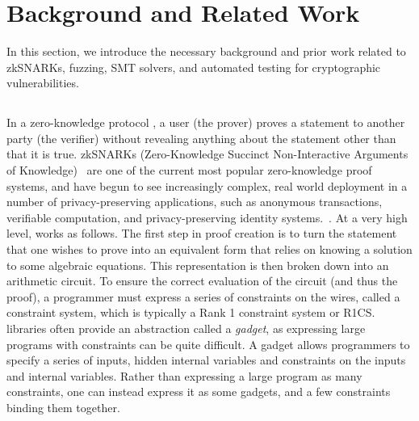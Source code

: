 \section{Background and Related Work}
\label{sec:snarkprobe-background}

In this section, we introduce the necessary background and prior work related to zkSNARKs, fuzzing, SMT solvers, and automated testing for cryptographic vulnerabilities.

\subsection{\zksnark}
In a zero-knowledge protocol \cite{goldreich2019proofs}, a user (the prover) proves a statement to another party (the verifier) without revealing anything about the statement other than that it is true.
zkSNARKs (Zero-Knowledge Succinct Non-Interactive Arguments of Knowledge)~\cite{ben2013snarks,parno2016pinocchio,groth2016size} are one of the current most popular zero-knowledge proof systems, and have begun to see increasingly complex, real world deployment in a number of privacy-preserving applications, such as anonymous transactions, verifiable computation, and privacy-preserving identity systems.~\cite{zcash,darkforest,aleo,filecoin,zkrollup,fan2025byzsfl,kosba2016hawk,bowe2020zexe}.
At a very high level, \zksnark works as follows.  The first step in proof creation is to turn the statement that one wishes to prove into an equivalent form that relies on knowing a solution to some algebraic equations.  This representation is then broken down into an arithmetic circuit.  To ensure the correct evaluation of the circuit (and thus the proof), a programmer must express a series of constraints on the wires, called a constraint system, which is typically a Rank 1 constraint system or R1CS. 
\zksnark libraries often provide an abstraction called a \textit{gadget}, as expressing large programs with constraints can be quite difficult.  A gadget allows programmers to specify a series of inputs, hidden internal variables and constraints on the inputs and internal variables. Rather than expressing a large program as many constraints, one can instead express it as some gadgets, and a few constraints binding them together.

